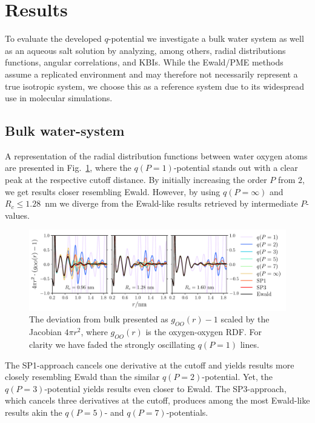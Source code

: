 \documentclass[
journal=jctcce,
manuscript=letter]{achemso}
\begin{document}
\section{Results}\label{sec:results}
To evaluate the developed $q$-potential we investigate a bulk water system as well as an aqueous salt solution by analyzing, among others, radial distributions functions, angular correlations, and KBIs.
While the Ewald/PME methods assume a replicated environment and may therefore not necessarily represent a true isotropic system\cite{hunenberger1999effect,stenqvist2018replicate}, we choose this as a reference system due to its widespread use in molecular simulations.

\subsection{Bulk water-system}\label{sec:bulk}
A representation of the radial distribution functions between water oxygen atoms are presented in Fig.~\ref{fig:rdf_m1}, where the $q(P=1)$-potential stands out with a clear peak at the respective cutoff distance. By initially increasing the order $P$ from $2$, we get results closer resembling Ewald. However, by using $q(P=\infty)$ and $R_c\le 1.28$~nm we diverge from the Ewald-like results retrieved by intermediate $P$-values. 
\begin{figure}[!t]
    \centering
    \includegraphics[width=1.0\columnwidth]{spce_rdf_log.pdf}
    \caption{The deviation from bulk presented as $g_{OO}(r)-1$ scaled by the Jacobian $4\pi r^2$, where $g_{OO}(r)$ is the oxygen-oxygen RDF. For clarity we have faded the strongly oscillating $q(P=1)$ lines.}
    \label{fig:rdf_m1}
\end{figure}
The SP1-approach cancels one derivative at the cutoff and yields results more closely resembling Ewald than the similar $q(P=2)$-potential. Yet, the $q(P=3)$-potential yields results even closer to Ewald. The SP3-approach, which cancels three derivatives at the cutoff, produces among the most Ewald-like results akin the $q(P=5)$- and $q(P=7)$-potentials.
\end{document}
